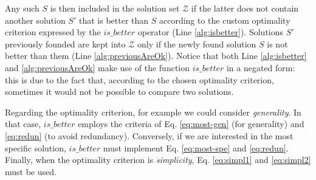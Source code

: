 Any such $S$ is then included in the solution set $\mathcal{Z}$ if the latter does not contain another solution $S'$ that is better than $S$ according to the custom optimality criterion expressed by the ${is\_better}$ operator (Line \ref{alg:isbetter}). Solutions $S'$ previously founded are kept into $\mathcal{Z}$ only if the newly found solution $S$ is not better than them (Line \ref{alg:previousAreOk}). Notice that both Line \ref{alg:isbetter} and \ref{alg:previousAreOk} make use of the function $is\_better$ in a negated form: this is due to the fact that, according to the chosen optimality criterion, sometimes it would not be possible to compare two solutions.

Regarding the optimality criterion, for example we could consider \emph{generality}. In that case, ${is\_better}$ employs the criteria of Eq. \eqref{eq:most-gen} (for generality) and \eqref{eq:redun} (to avoid redundancy). Conversely, if we are interested in the most specific solution, ${is\_better}$ must implement Eq. \eqref{eq:most-spe} and \eqref{eq:redun}.
Finally, when the optimality criterion is \emph{simplicity}, Eq. \eqref{eq:simpl1} and \eqref{eq:simpl2} must be used.


